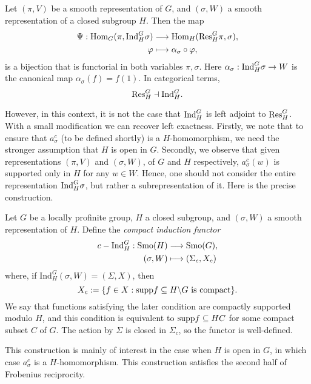 \begin{thm}\label{thm:frob}
	Let $(\pi,V)$ be a smooth representation of $G$, and $(\sigma,W)$ a smooth representation of a closed subgroup $H$. Then the map
	\begin{align*}
		\Psi:\mathrm{Hom}_G(\pi, \mathrm{Ind}_H^G\sigma)&\longrightarrow \mathrm{Hom}_H(\mathrm{Res}_H^G \pi, \sigma),\\
		\varphi &\longmapsto \alpha_\sigma \circ \varphi,
	\end{align*}
    is a bijection that is functorial in both variables $\pi,\sigma$. Here $\alpha_\sigma:\mathrm{Ind}_H^G\sigma \to W$ is the canonical map $\alpha_\sigma(f) = f(1)$. In categorical terms,
    $$\mathrm{Res}_H^G\dashv\mathrm{Ind}_H^G.$$
\end{thm}

However, in this context, it is not the case that $\mathrm{Ind}_H^G$ is left adjoint to $\mathrm{Res}_H^G$. With a small modification we can recover left exactness. Firstly, we note that to ensure that $a_\sigma^c$ (to be defined shortly) is a $H$-homomorphism, we need the stronger assumption that $H$ is open in $G$. Secondly, we observe that given representations $(\pi,V)$ and $(\sigma,W)$, of $G$ and $H$ respectively, $a_\sigma^c(w)$ is supported only in $H$ for any $w\in W$. Hence, one should not consider the entire representation $\mathrm{Ind}_H^G\sigma$, but rather a subrepresentation of it. Here is the precise construction.

\begin{defn}
	Let $G$ be a locally profinite group, $H$ a closed subgroup, and $(\sigma,W)$ a smooth representation of $H$. Define the \textit{compact induction functor} 
    \begin{align*}
        c-\mathrm{Ind}_H^G:\mathrm{Smo}(H)&\longrightarrow\mathrm{Smo}(G),\\
        (\sigma,W)&\longmapsto(\Sigma_c,X_c)
    \end{align*}
    where, if $\mathrm{Ind}_H^G(\sigma,W) = (\Sigma,X)$, then
    $$X_c:=\{f\in X: \mathrm{supp} f\subseteq H\backslash G \text{ is compact}\}.$$
    We say that functions satisfying the later condition are compactly supported modulo $H$, and this condition is equivalent to $\mathrm{supp} f\subseteq HC$ for some compact subset $C$ of $G$.
    The action by $\Sigma$ is closed in $\Sigma_c$, so the functor is well-defined.
\end{defn}

This construction is mainly of interest in the case when $H$ is open in $G$, in which case $a_\sigma^c$ is a $H$-homomorphism. This construction satisfies the second half of Frobenius reciprocity.

